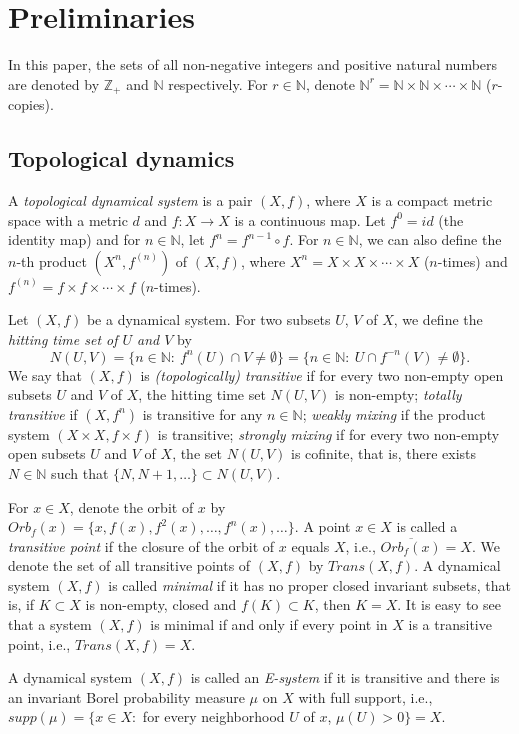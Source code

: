 \documentclass[12pt,a4paper]{amsart}
\theoremstyle{definition}
\numberwithin{equation}{section}
\begin{document}
\section{Preliminaries}
In this paper, the sets of all non-negative integers and positive natural numbers
are denoted by $\mathbb{Z}_+$ and $\mathbb{N}$ respectively.
For $r\in\mathbb{N}$, denote $\mathbb{N}^r=\mathbb{N}\times \mathbb{N}\times \dotsb\times \mathbb{N}$ ($r$-copies).
\subsection{Topological dynamics}
A \emph{topological dynamical system} is a pair $(X, f)$,
where $X$ is a compact metric space with a metric $d$ and $f:X\rightarrow X$ is a continuous map.
Let $f^{0}=id$ (the identity map) and for $n\in\mathbb{N}$,  let $f^n=f^{n-1}\circ f$.
For $n\in\mathbb{N}$, we can also define the $n$-th product $(X^n,f^{(n)})$ of $(X,f)$,
where $X^n=X\times X\times \dotsb\times X$ ($n$-times) and $f^{(n)}=f\times f\times \dotsb\times f$ ($n$-times).

Let $(X, f)$ be a dynamical system.
For two subsets $U$, $V$ of $X$, we define the \emph{hitting time set of $U$ and $V$} by
\[N(U,V)=\{n\in\mathbb{N}:\ f^n(U)\cap V\neq\emptyset\}=\{n\in\mathbb{N}:\ U\cap f^{-n}(V)\neq\emptyset\}.\]
We say that $(X,f)$ is \emph{(topologically) transitive} if for every
two non-empty open subsets $U$ and $V$ of $X$, the hitting time set $N(U,V)$ is non-empty;
\emph{totally transitive} if $(X,f^n)$ is transitive for any $n\in\mathbb{N}$;
\emph{weakly mixing} if the product system $(X\times X,f\times f)$ is transitive;
\emph{strongly mixing} if for every
two non-empty open subsets $U$ and $V$ of $X$, the set $N(U,V)$ is cofinite,
that is, there exists $N\in\mathbb{N}$ such that $\{N,N+1,\dotsc\}\subset N(U,V)$.

For $x\in X$, denote the orbit of $x$ by  $Orb_f(x)=\{x,f(x),f^2(x),\dotsc,f^n(x),\dotsc\}$.
A point $x\in X$ is called a \emph{transitive point}
if the closure of the orbit of $x$ equals $X$, i.e., $\overline{Orb_f(x)}=X$.
We denote the set of all transitive points of $(X,f)$ by $Trans(X, f)$.
A dynamical system $(X,f)$ is called \emph{minimal} if it has no proper closed invariant subsets, that is,
if $K\subset X$ is non-empty, closed and $f(K)\subset K$, then $K=X$. It is easy to see that
a system $(X,f)$ is minimal if and only if every point in $X$ is a transitive point, i.e., $Trans(X, f)=X$.

A dynamical system $(X, f)$ is called an {\it E-system} if it is transitive and there is an invariant Borel
probability measure $\mu$ on $X$ with full support, i.e.,
$supp(\mu)=\{x\in X:$ for every neighborhood $U$ \mbox{of} $x$, $\mu(U)>0\}=X$.
\end{document}
